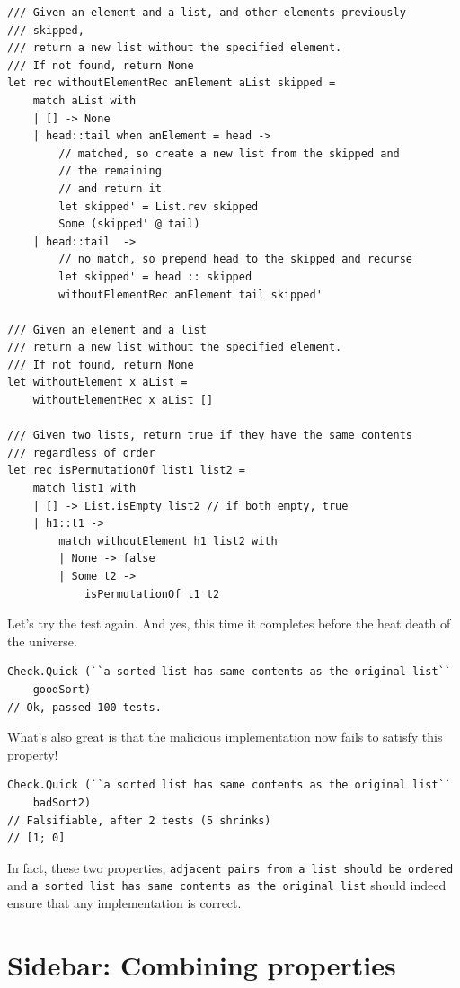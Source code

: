 \begin{verbatim}
/// Given an element and a list, and other elements previously 
/// skipped,
/// return a new list without the specified element.
/// If not found, return None
let rec withoutElementRec anElement aList skipped = 
	match aList with
	| [] -> None
	| head::tail when anElement = head -> 
		// matched, so create a new list from the skipped and 
		// the remaining
		// and return it
		let skipped' = List.rev skipped
		Some (skipped' @ tail)
	| head::tail  -> 
		// no match, so prepend head to the skipped and recurse 
		let skipped' = head :: skipped
		withoutElementRec anElement tail skipped' 

/// Given an element and a list
/// return a new list without the specified element.
/// If not found, return None
let withoutElement x aList = 
	withoutElementRec x aList [] 

/// Given two lists, return true if they have the same contents
/// regardless of order
let rec isPermutationOf list1 list2 = 
	match list1 with
	| [] -> List.isEmpty list2 // if both empty, true
	| h1::t1 -> 
		match withoutElement h1 list2 with
		| None -> false
		| Some t2 -> 
			isPermutationOf t1 t2
\end{verbatim}

Let's try the test again. And yes, this time it completes before the
heat death of the universe.

\begin{verbatim}
Check.Quick (``a sorted list has same contents as the original list``  
    goodSort)
// Ok, passed 100 tests.
\end{verbatim}
What's also great is that the malicious implementation now fails to
satisfy this property!

\begin{verbatim}
Check.Quick (``a sorted list has same contents as the original list``  
    badSort2)
// Falsifiable, after 2 tests (5 shrinks) 
// [1; 0]
\end{verbatim}
In fact, these two properties,
\texttt{adjacent\ pairs\ from\ a\ list\ should\ be\ ordered} and
\texttt{a\ sorted\ list\ has\ same\ contents\ as\ the\ original\ list}
should indeed ensure that any implementation is correct.

\section{Sidebar: Combining
properties}\label{sidebar-combining-properties}

